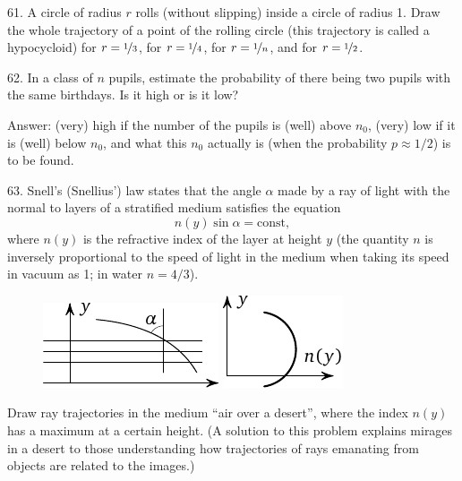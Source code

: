 \begin{problem}{61.}
	A circle of radius $r$ rolls (without slipping) inside a circle of radius 1.
	Draw the whole trajectory of a point of the rolling circle (this trajectory is called a hypocycloid) 
	for $r=\nicefrac{1}{3}$, for $r=\nicefrac{1}{4}$, for $r=\nicefrac{1}{n}$, and for $r=\nicefrac{1}{2}$.
\end{problem}

\begin{problem}{62.}
	In a class of $n$ pupils, estimate the probability of there being two pupils with the same birthdays. Is it high or is it low?

	\begin{note}{Answer:}
		(very) high if the number of the pupils is (well) above $n_0$,
		(very) low if it is (well) below $n_0$, and what this $n_0$ actually is
		(when the probability $p \approx 1/2$) is to be found.
	\end{note}
\end{problem}

\begin{problem}{63.}
	Snell's (Snellius') law states that the angle $\alpha$ made by a ray of light with the normal to layers of a stratified medium satisfies the equation
	\begin{equation*}
		n(y) \sin \alpha=\text{const},
	\end{equation*}
	where $n(y)$ is the refractive index of the layer at height $y$ (the quantity $n$ is	inversely proportional to the speed 
	of light in the medium when taking its speed in vacuum as 1; in water $n=4/3$).
	\begin{figure}
		\null\hfill
		\includegraphics{taskbook-47}
		\hfill
		\includegraphics{taskbook-471}
		\hfill\null
	\end{figure}

	Draw ray trajectories in the medium  \enquote{air over a desert}, where the index $n(y)$ has a maximum
	at a certain height.
	(A solution to this problem explains mirages in a desert to those understanding how trajectories of rays emanating from objects are related to the images.)
\end{problem}

